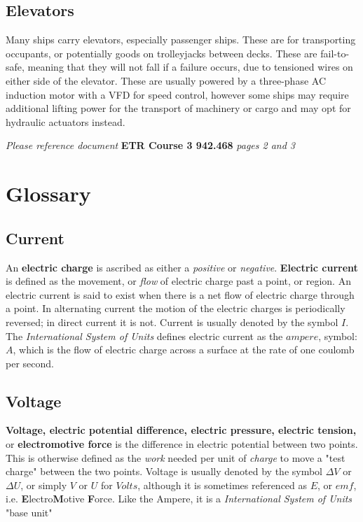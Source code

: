 \documentclass[11pt,a4paper]{article}
\begin{document}
\subsection{Elevators}
Many ships carry elevators, especially passenger ships. These are for transporting occupants, or potentially goods on trolleyjacks between decks. These are fail-to-safe, meaning that they will not fall if a failure occurs, due to tensioned wires on either side of the elevator. These are usually powered by a three-phase AC induction motor with a VFD for speed control, however some ships may require additional lifting power for the transport of machinery or cargo and may opt for hydraulic actuators instead.
\newpage
{}
\begin{tcolorbox}[colback=red!5!white,colframe=red!75!black,title=\textbf{Demonstrate basic knowledge of the operation of electro technical systems on board}]
\textit{Please reference document} \textbf{ETR Course 3 942.468} \textit{pages 2 and 3}
\end{tcolorbox}
\section{Glossary}
\subsection*{Current}
An \textbf{electric charge} is ascribed as either a \textit{positive} or \textit{negative}.\cite{e1} \textbf{Electric current} is defined as the movement, or \textit{flow} of electric charge past a point, or region.\cite{e3} An electric current is said to exist when there is a net flow of electric charge through a point.\cite{e4} In alternating current the motion of the electric charges is periodically reversed; in direct current it is not. Current is usually denoted by the symbol $I$.\cite{e5} The \textit{International System of Units} defines electric current as the $ampere$, symbol: $A$, which is the flow of electric charge across a surface at the rate of one coulomb per second.\cite{e2}
\subsection*{Voltage}
\textbf{Voltage, electric potential difference, electric pressure,  electric tension,} or \textbf{electromotive force} is the difference in electric potential between two points.\cite{e1} This is otherwise defined as the \textit{work} needed per unit of \textit{charge} to move a "test charge" between the two points.\cite{e4} Voltage is usually denoted by the symbol $\Delta V$ or $\Delta U$, or simply $V$ or $U$ for $Volts$, although it is sometimes referenced as $E$, or $emf$, i.e. \textbf{E}lectro\textbf{M}otive \textbf{F}orce. Like the Ampere, it is a \textit{International System of Units} "base unit"\cite{e2}
\end{document}
